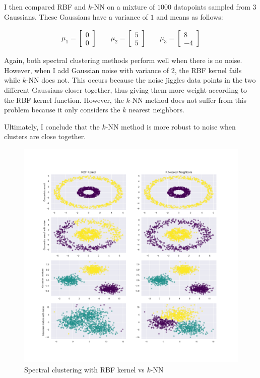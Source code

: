 \documentclass{article}
\begin{document}
    I then compared RBF and $k$-NN on a mixture of $1000$ datapoints sampled from $3$ Gaussians. These Gaussians have a variance of $1$ and means as follows:
    
    \begin{align*}
        \mu_1 = \begin{bmatrix} 0 \\ 0 \end{bmatrix} \qquad \mu_2 = \begin{bmatrix} 5 \\ 5 \end{bmatrix} \qquad \mu_3 = \begin{bmatrix} 8 \\ -4 \end{bmatrix}
    \end{align*}

    Again, both spectral clustering methods perform well when there is no noise. However, when I add Gaussian noise with variance of $2$, the RBF kernel fails while $k$-NN does not. This occurs because the noise jiggles data points in the two different Gaussians closer together, thus giving them more weight according to the RBF kernel function. However, the $k$-NN method does not suffer from this problem because it only considers the $k$ nearest neighbors.

    Ultimately, I conclude that the $k$-NN method is more robust to noise when clusters are close together.

    \begin{figure}[ht]
        \label{fig:rbf_vs_knn}
        \includegraphics[width=0.99\linewidth]{images/q7/spectral_clustering:_rbf_vs_knn.png}
        \caption{Spectral clustering with RBF kernel vs $k$-NN}
    \end{figure}
    \pagebreak
\end{document}
